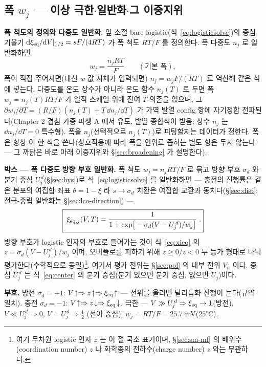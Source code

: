\subsection{폭 $w_j$ --- 이상 극한$\cdot$일반화$\cdot$그 이중지위}\label{sec:width-w}
\textbf{폭 척도의 정의와 다중도 일반화.} 앞 소절 bare logistic(식~\eqref{eq:logisticsolve})의 중심 기울기
$\mathrm{d}\xi_{\mathrm{eq}}/\mathrm{d} V|_{1/2}=sF/(4RT)$ 가 폭 척도 $RT/F$ 를 정의한다. 폭 다중도 $n_j$ 로 일반화하면
\begin{equation}
w_j=\frac{n_jRT}{F}\qquad(\text{기본 폭}),
\label{eq:wbase}
\end{equation}
폭이 직접 주어지면(대신 $w$ 값 자체가 입력되면) $n_j=w_jF/(RT)$ 로 역산해 같은 식에 넣는다.
다중도를 온도 상수가 아니라 온도 함수 $n_j(T)$ 로 두면 폭 $w_j=n_j(T)RT/F$ 가 열적 스케일 위에 잔여 $T$-의존을
얹으며, 그 $\partial w_j/\partial T=(R/F)(n_j(T)+T\,\dd n_j/\dd T)$ 가 가역 발열 config 항에 자기정합 전파된다(Chapter 2
겹침 가중 파생 A 에서 유도, 발열 종합식이 받음; 상수 $n_j$ 는 $\dd n_j/\dd T{=}0$ 특수형). 폭을 $n_j$(선택적으로 $n_j(T)$)로 피팅할지는 데이터가 정한다.
폭은 항상 이 한 식을 쓴다(상호작용에 따라 폭을 인위로 좁히는 별도 항은 두지 않는다 --- 그 까닭은 바로 아래
이중지위와 \S\ref{sec:broadening} 가 설명한다).

\textbf{박스 --- 폭 다중도$\cdot$방향 부호 일반화.} 폭 척도 $w_j=n_jRT/F$ 로 묶고 방향 부호 $\sigma_d$ 와 분기
중심 $U_j^{\,d}$(\S\ref{sec:hys})로 식~\eqref{eq:logisticsolve} 를 일반화하면 --- 충전의 진행률은 같은 분포의
여집합 좌표 $\theta=1-\xi$ 라 $s\to\sigma_d$ 치환은 여집합 교환과 동치다(\S\ref{sec:dist}; 전극-중립
일반화는 \S\ref{sec:lco-direction}) ---
\begin{equation}
\boxed{\;\xi_{\mathrm{eq},j}(V,T)=\frac{1}{1+\exp\!\big[-\sigma_d(V-U_j^{\,d})/w_j\big]}\;.}
\label{eq:xieq}
\end{equation}
방향 부호가 logistic 인자의 부호로 들어가는 것이 식~\eqref{eq:xieq} 의 $z=\sigma_d(V-U_j^{\,d})/w_j$ 이며,
오버플로를 피하기 위해 $z\ge0/z<0$ 두 등가 형태로 나눠 평가한다(수학적으로
동일)\footnote{여기 무차원 logistic 인자 $z$ 는 이 절 국소 표기이며, \S\ref{sec:sm-mf} 의 배위수(coordination
number) $z$ 나 화학종의 전하수(charge number) $z$ 와는 무관하다.}. 여기서 평가 전위는 \S\ref{sec:pol} 의 내부 전위 $V_n$ 이다. 중심 $U_j^{\,d}$
는 식~\eqref{eq:center} 의 분기 중심(분기 있으면 분기 중심, 없으면 $U_j$)이다.

\begin{signbox}
\textbf{부호.} 방전 $\sigma_d=+1$: $V\!\uparrow\Rightarrow z\!\uparrow\Rightarrow\xi_{\mathrm{eq}}\!\uparrow$ --- 전위를 올리면
탈리튬화 진행이 는다(규약 일치). 충전 $\sigma_d=-1$: $V\!\uparrow\Rightarrow z\!\downarrow\Rightarrow\xi_{\mathrm{eq}}\!\downarrow$.
극한 --- $V\gg U_j^{\,d}\Rightarrow\xi_{\mathrm{eq}}\to1$(방전), $V\ll U_j^{\,d}\Rightarrow0$, $V=U_j^{\,d}\Rightarrow\tfrac12$
(전이 중심). $w_j=RT/F=25.7$ mV($25^\circ$C).
\end{signbox}

